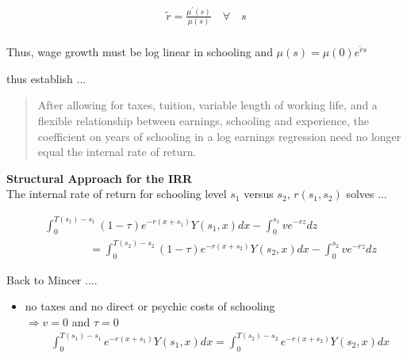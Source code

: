 \begin{frame}
\begin{align*}
\tilde{r} = \frac{\mu^\prime(s)}{\mu(s)}\quad\forall\quad s\\
\end{align*}

Thus, wage growth must be log linear in schooling and $\mu(s) = \mu(0)e^{\tilde{r}s}$
\end{frame}




\begin{frame}
\cite{Heckman.2006a} thus establish ... \vspace{0.5cm}

\begin{quote}
After allowing for taxes, tuition, variable length of working life, and a flexible relationship between earnings, schooling and experience, the coefficient on years of schooling in a log earnings regression need no longer equal the internal rate of return.
\end{quote}
\end{frame}


\begin{frame}\textbf{Structural Approach for the IRR}\vspace{0.3cm}\\

The internal rate of return for schooling level $s_1$ versus $s_2$, $r(s_1, s_2)$ solves ...

\begin{align*}
&\int_{0}^{T(s_1) - s_1} (1 - \tau)e^{-r(x + s_1)}Y(s_1, x) dx  - \int_{0}^{s_1} v e^{-r z} dz\\
&\qquad\qquad =  \int_{0}^{T(s_2) - s_2} (1 - \tau)e^{-r(x + s_2)}Y(s_2, x) dx - \int_{0}^{s_2} v e^{-r z} dz
\end{align*}

\end{frame}

\begin{frame}
Back to Mincer ....

\begin{itemize}
\item no taxes and no direct or psychic costs of schooling \\\vspace{0.3cm}
\hspace{0.3cm}$\Rightarrow v = 0$ and $\tau = 0$\vspace{0.3cm}
\begin{align*}
&\int_{0}^{T(s_1) - s_1} e^{-r(x + s_1)}Y(s_1, x) dx  = \int_{0}^{T(s_2) - s_2} e^{-r(x + s_2)}Y(s_2, x) dx
\end{align*}
\end{itemize}\end{frame}


